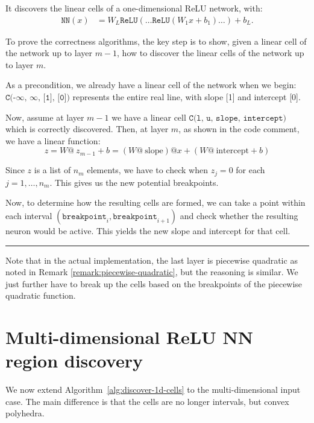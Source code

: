 \documentclass[10pt]{extarticle}
\begin{document}
It discovers the linear cells of a one-dimensional ReLU network, with:
\begin{align}
  \texttt{NN}(x) &= W_L\texttt{ReLU}(\ldots\texttt{ReLU}(W_1x+b_1)\ldots)+b_L.
\end{align}

To prove the correctness algorithms, the key step is to show, given a linear cell of the
network up to layer \(m-1\), how to discover the linear cells of the network up to layer \(m\).

As a precondition, we already have a linear cell of the network when we begin: 
$\texttt{C(-$\infty$, $\infty$, [1], [0])}$ represents the entire real line, with slope [1] and intercept [0].

Now, assume at layer \(m-1\) we have a linear cell \(\texttt{C(l, u, slope, intercept)}\) which is 
correctly discovered.  Then, at layer \(m\), as shown in the code comment, we have a linear function:
\begin{equation}
  z = W \texttt{@} \ z_{m-1} + b = (W \texttt{@} \ \text{slope}) \texttt{@} x + (W \texttt{@} \ \text{intercept} + b)
\end{equation}

Since $z$ is a list of $n_m$ elements, we have to check when $z_j = 0$ for each $j=1,\ldots,n_m$.  
This gives us the new potential breakpoints.

Now, to determine how the resulting cells are formed, we can take a point within each interval 
$(\texttt{breakpoint}_i, \texttt{breakpoint}_{i+1})$ and check whether the resulting neuron 
would be active. This yields the new slope and intercept for that cell.

\vspace{1em}
\hrule 
\vspace{1em}


Note that in the actual implementation, the last layer is piecewise quadratic as noted in
Remark \ref{remark:piecewise-quadratic}, but the reasoning is similar. We just further
have to break up the cells based on the breakpoints of the piecewise quadratic function.

\section{Multi-dimensional ReLU NN region discovery}

We now extend Algorithm~\ref{alg:discover-1d-cells} to the multi-dimensional input case.
The main difference is that the cells are no longer intervals, but convex polyhedra.
\end{document}

